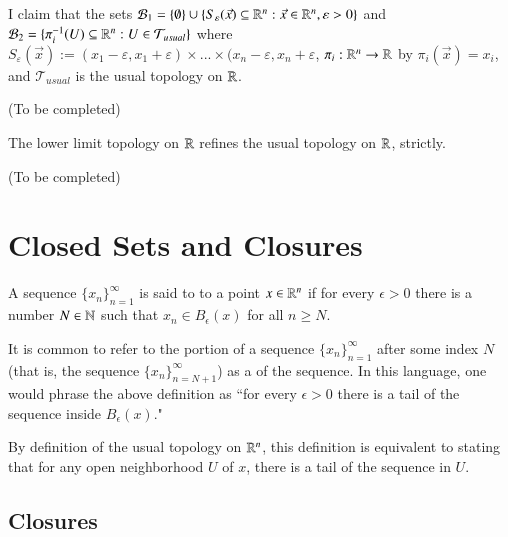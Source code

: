 \documentclass[12pt, a4paper, twoside, openright, titlepage]{book}
\begin{document}
\begin{xca*}{}{}
    I claim that the sets $\mathcal{B}_1 =  \{\emptyset\}\cup\{S_{\varepsilon}(\vec{x}) \subseteq \mathbb R^n:\vec{x} \in \mathbb R^n, \varepsilon >0\}$ and $\mathcal{B}_2 = \{\pi_i^{-1}(U) \subseteq \mathbb R^n:U \in \mathcal{T}_{usual}\}$ where $S_{\varepsilon}(\vec{x}) := (x_1-\varepsilon,x_1+\varepsilon)\times ... \times(x_n-\varepsilon,x_n+\varepsilon$, $\pi_i:\mathbb R^n\rightarrow \mathbb R$ by $\pi_i(\vec{x}) = x_i$, and $\mathcal{T}_{usual}$ is the usual topology on $\mathbb R$.
\end{xca*}
\begin{proof*}{}{}
    (To be completed)
\end{proof*}


\begin{xca*}{}{}
    The lower limit topology on $\mathbb R$ refines the usual topology on $\mathbb R$, strictly.
\end{xca*}
\begin{proof*}{}{}
    (To be completed)
\end{proof*}




\section{Closed Sets and Closures}


\begin{defn}{}{}
    A sequence $\{x_n\}_{n=1}^{\infty}$ is said to  to a point $x \in \mathbb R^n$ if for every $\epsilon > 0$ there is a number $N \in \mathbb N$ such that $x_n \in B_{\epsilon}(x)$ for all $n \geq N$.
\end{defn}

\begin{rmk}{}{}
    It is common to refer to the portion of a sequence $\{x_n\}_{n=1}^{\infty}$ after some index $N$ (that is, the sequence $\{x_n\}_{n=N+1}^{\infty}$) as a  of the sequence. In this language, one would phrase the above definition as ``for every $\epsilon > 0$ there is a tail of the sequence inside $B_{\epsilon}(x)$."
\end{rmk}

\begin{rmk}{}{}
    By definition of the usual topology on $\mathbb R^n$, this definition is equivalent to stating that for any open neighborhood $U$ of $x$, there is a tail of the sequence in $U$.
\end{rmk}


\subsection{Closures}
\end{document}
